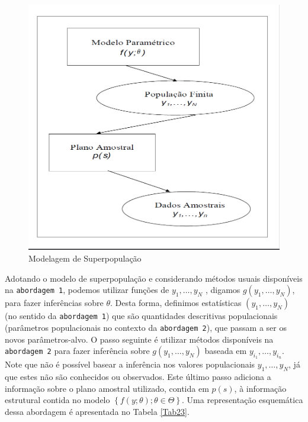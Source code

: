 \documentclass[]{book}
\theoremstyle{definition}
\theoremstyle{definition}
\theoremstyle{definition}
\theoremstyle{remark}
\begin{document}
\begin{figure}
\centering
\includegraphics{Figuras/fig23.png}
\caption{\label{fig:modsup}Modelagem de Superpopulação}
\end{figure}

Adotando o modelo de superpopulação e considerando métodos usuais
disponíveis na \texttt{abordagem\ 1}, podemos utilizar funções de
\(y_{1},\ldots ,y_{N}\) , digamos \(g( y_{1},\ldots ,y_{N})\), para
fazer inferências sobre \(\theta\). Desta forma, definimos estatísticas
\(\left( y_{1},\ldots ,y_{N}\right)\) (no sentido da
\texttt{abordagem\ 1}) que são quantidades descritivas populacionais
(parâmetros populacionais no contexto da \texttt{abordagem\ 2}), que
passam a ser os novos parâmetros-alvo. O passo seguinte é utilizar
métodos disponíveis na \texttt{abordagem\ 2} para fazer inferência sobre
\(g\left( y_{1},\ldots ,y_{N}\right)\) baseada em
\(y_{i_1},\ldots ,y_{i_n}\). Note que não é possível basear a inferência
nos valores populacionais \(y_{1},\ldots ,y_{N}\), já que estes não são
conhecidos ou observados. Este último passo adiciona a informação sobre
o plano amostral utilizado, contida em \(p(s)\), à informação estrutural
contida no modelo
\(\left\{ f\left( y;\theta \right) ;\theta \in \Theta\right\}\). Uma
representação esquemática dessa abordagem é apresentada no Tabela
\ref{Tab23}.
\end{document}

